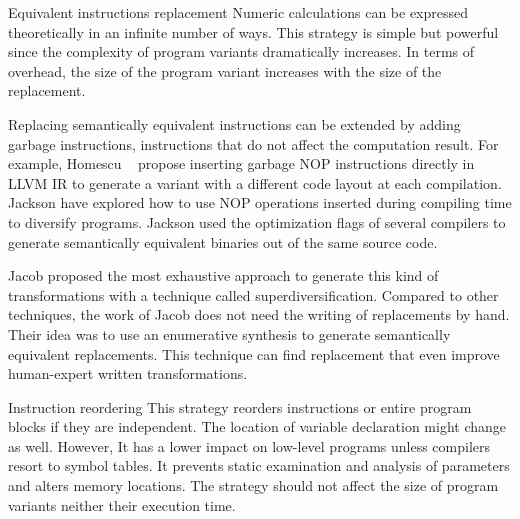 



\begin{strategy}{Equivalent instructions replacement}
    \label{strategy:S1}
    \normalfont
    Numeric calculations can be expressed theoretically in an infinite number of ways. This strategy is simple but powerful since the complexity of program variants dramatically increases. In terms of overhead, the size of the program variant increases with the size of the replacement. 

    Replacing semantically equivalent instructions can be extended by adding garbage instructions, \ie instructions that do not affect the computation result. For example, Homescu \etal~\cite{homescu2013profile} propose inserting garbage NOP instructions directly in LLVM IR to generate a variant with a different code layout at each compilation. 
    Jackson \etal \cite{jackson} have explored how to use NOP operations inserted during compiling time to diversify programs. Jackson \etal \cite{jackson}  used the optimization flags of several compilers to generate semantically equivalent binaries out of the same source code. 
    

    Jacob \etal \cite{jacob2008superdiversifier} proposed the most exhaustive approach to generate this kind of transformations with a technique called superdiversification. Compared to other techniques, the work of Jacob does not need the writing of replacements by hand. Their idea was to use an enumerative synthesis to generate semantically equivalent replacements. This technique can find replacement that even improve human-expert written transformations. 
     
\end{strategy}


\begin{strategy}{Instruction reordering}
    \label{strategy:S2}
    \normalfont
    This strategy reorders instructions or entire program blocks if they are independent.
    The location of variable declaration might change as well. However, It has a lower impact on low-level programs unless compilers resort to symbol tables. It prevents static examination and analysis of parameters and alters memory locations. The strategy should not affect the size of program variants neither their execution time.

\end{strategy}


